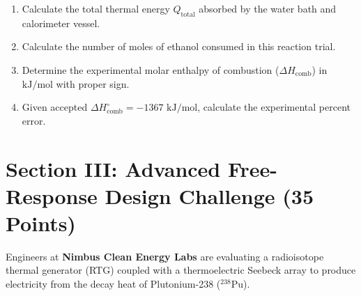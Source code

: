 \documentclass[11pt,a4paper]{article}
\begin{document}
\begin{enumerate}[label=\alph*), leftmargin=1.5em, itemsep=0.15em]
  \item Calculate the total thermal energy $Q_{\text{total}}$ absorbed by the water bath and calorimeter vessel.
  \item Calculate the number of moles of ethanol consumed in this reaction trial.
  \item Determine the experimental molar enthalpy of combustion ($\Delta H_{\text{comb}}$) in $\text{kJ/mol}$ with proper sign.
  \item Given accepted $\Delta H_{\text{comb}}^\circ = -1367\text{ kJ/mol}$, calculate the experimental percent error.
\end{enumerate}

\begin{tcolorbox}[workspace, height=12.0cm]
\end{tcolorbox}

\newpage

\section{Section III: Advanced Free-Response Design Challenge (35 Points)}

\begin{tcolorbox}[basebox, colframe=NavyMain, title={\faAtom\:\: Scenario: Photovoltaic-Thermal Hybrid Cell for Space Probes}]
  Engineers at \textbf{Nimbus Clean Energy Labs} are evaluating a radioisotope thermal generator (RTG) coupled with a thermoelectric Seebeck array to produce electricity from the decay heat of Plutonium-238 ($^{238}\text{Pu}$).
\end{tcolorbox}

\vspace{0.05cm}
\end{document}
